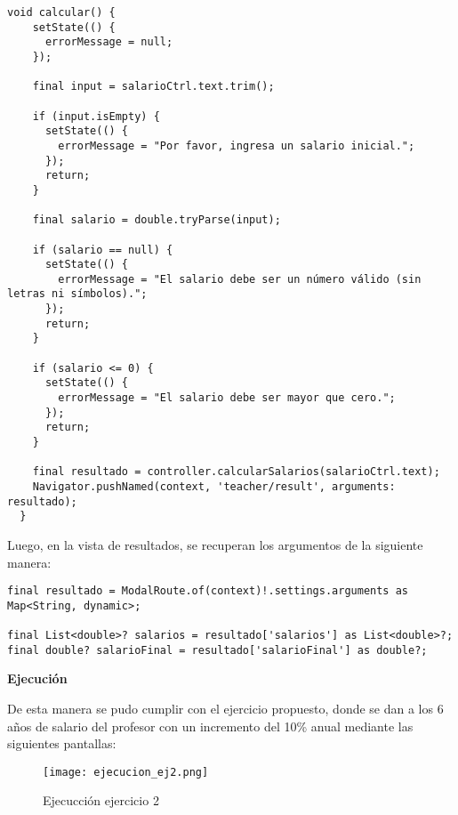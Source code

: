 \begin{center}
\begin{lstlisting}
void calcular() {
    setState(() {
      errorMessage = null;
    });

    final input = salarioCtrl.text.trim();

    if (input.isEmpty) {
      setState(() {
        errorMessage = "Por favor, ingresa un salario inicial.";
      });
      return;
    }

    final salario = double.tryParse(input);

    if (salario == null) {
      setState(() {
        errorMessage = "El salario debe ser un número válido (sin letras ni símbolos).";
      });
      return;
    }

    if (salario <= 0) {
      setState(() {
        errorMessage = "El salario debe ser mayor que cero.";
      });
      return;
    }

    final resultado = controller.calcularSalarios(salarioCtrl.text);
    Navigator.pushNamed(context, 'teacher/result', arguments: resultado);
  }
\end{lstlisting}
\end{center}

Luego, en la vista de resultados, se recuperan los argumentos de la siguiente manera:

\begin{center}
\begin{lstlisting}
final resultado = ModalRoute.of(context)!.settings.arguments as Map<String, dynamic>;

final List<double>? salarios = resultado['salarios'] as List<double>?;
final double? salarioFinal = resultado['salarioFinal'] as double?;
\end{lstlisting}
\end{center}

\textbf{Ejecución}

De esta manera se pudo cumplir con el ejercicio propuesto, donde se dan a los 6 años de salario del profesor con un incremento del 10\% anual mediante las siguientes pantallas:

\begin{figure}[H]
    \centering
    \texttt{[image: ejecucion\_ej2.png]}
    \caption{Ejecucción ejercicio 2}
    \label{fig:ej2_ejecucion}
\end{figure}